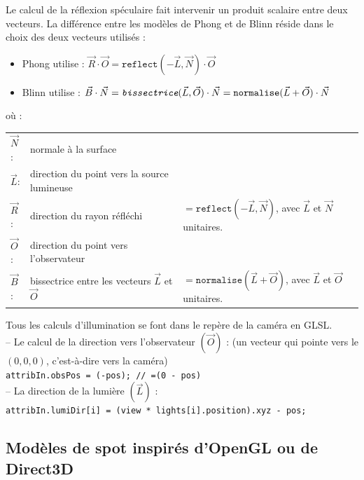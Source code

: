 \documentclass{article}[letterpaper, 11pt]
\begin{document}
Le calcul de la réflexion spéculaire fait intervenir un produit scalaire entre deux vecteurs. La différence entre les modèles de Phong et de Blinn réside dans le choix des deux vecteurs utilisés :
\begin{itemize}[label={--}]
	\item Phong utilise : $\vec{R} \cdot \vec{O} = \texttt{reflect}(-\vec{L}, \vec{N}) \cdot \vec{O}$
	\item Blinn utilise : $\vec{B} \cdot \vec{N} = \textit{\texttt{bissectrice}}(\vec{L}, \vec{O}) \cdot \vec{N} = \texttt{normalise}(\vec{L} + \vec{O}) \cdot \vec{N}$
\end{itemize}
où :\\
\begin{tabular}{lll}
	$\vec{N}$: & normale à la surface & \\
	$\vec{L}$: & direction du point vers la source lumineuse & \\
	$\vec{R}$: & direction du rayon réfléchi & $= \texttt{reflect}(-\vec{L}, \vec{N})$, avec $\vec{L}$ et $\vec{N}$ unitaires. \\
	$\vec{O}$: & direction du point vers l'observateur & \\
	$\vec{B}$: & bissectrice entre les vecteurs $\vec{L}$ et $\vec{O}$ & $= \texttt{normalise}(\vec{L} + \vec{O})$, avec $\vec{L}$ et $\vec{O}$ unitaires. \\
\end{tabular}

Tous les calculs d'illumination se font dans le repère de la caméra en GLSL.\vspace*{11pt}
\\
-- Le calcul de la direction vers l'observateur $(\vec{O})$ : (un vecteur qui pointe vers le $(0,0,0)$, c'est-à-dire vers la caméra)\\
\texttt{attribIn.obsPos = (-pos); // =(0 - pos)}\vspace*{11pt}\\
-- La direction de la lumière $(\vec{L})$ :\\
\texttt{attribIn.lumiDir[i] = (view * lights[i].position).xyz - pos;}

\newpage
\subsection{Modèles de spot inspirés d'OpenGL ou de Direct3D}
\end{document}
